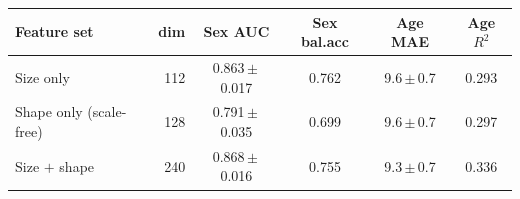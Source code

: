 \begin{tabular}{lrcccc}
\toprule
Feature set & dim & Sex AUC & Sex bal.acc & Age MAE & Age $R^2$ \\
\midrule
Size only & 112 & 0.863\,$\pm$\,0.017 & 0.762 & 9.6\,$\pm$\,0.7 & 0.293 \\
Shape only (scale-free) & 128 & 0.791\,$\pm$\,0.035 & 0.699 & 9.6\,$\pm$\,0.7 & 0.297 \\
Size $+$ shape & 240 & 0.868\,$\pm$\,0.016 & 0.755 & 9.3\,$\pm$\,0.7 & 0.336 \\
\bottomrule
\end{tabular}
